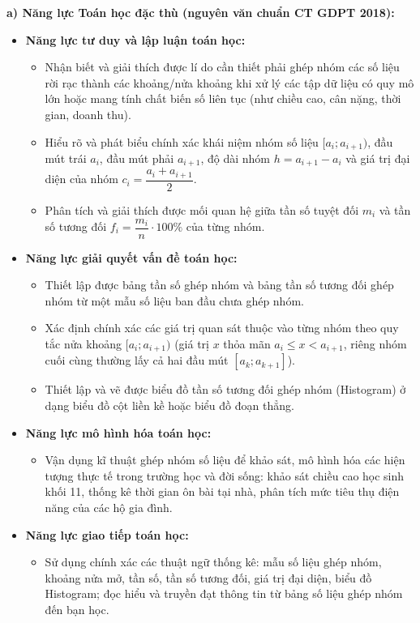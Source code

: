 \documentclass[12pt, a4paper]{article}
\begin{document}
\textbf{a) Năng lực Toán học đặc thù (nguyên văn chuẩn CT GDPT 2018):}
\begin{itemize}[leftmargin=1.5em]
    \item \textbf{Năng lực tư duy và lập luận toán học:}
    \begin{itemize}
        \item Nhận biết và giải thích được lí do cần thiết phải ghép nhóm các số liệu rời rạc thành các khoảng/nửa khoảng khi xử lý các tập dữ liệu có quy mô lớn hoặc mang tính chất biến số liên tục (như chiều cao, cân nặng, thời gian, doanh thu).
        \item Hiểu rõ và phát biểu chính xác khái niệm nhóm số liệu $[a_i; a_{i+1})$, đầu mút trái $a_i$, đầu mút phải $a_{i+1}$, độ dài nhóm $h = a_{i+1} - a_i$ và giá trị đại diện của nhóm $c_i = \dfrac{a_i + a_{i+1}}{2}$.
        \item Phân tích và giải thích được mối quan hệ giữa tần số tuyệt đối $m_i$ và tần số tương đối $f_i = \dfrac{m_i}{n} \cdot 100\%$ của từng nhóm.
    \end{itemize}
    \item \textbf{Năng lực giải quyết vấn đề toán học:}
    \begin{itemize}
        \item Thiết lập được bảng tần số ghép nhóm và bảng tần số tương đối ghép nhóm từ một mẫu số liệu ban đầu chưa ghép nhóm.
        \item Xác định chính xác các giá trị quan sát thuộc vào từng nhóm theo quy tắc nửa khoảng $[a_i; a_{i+1})$ (giá trị $x$ thỏa mãn $a_i \le x < a_{i+1}$, riêng nhóm cuối cùng thường lấy cả hai đầu mút $[a_k; a_{k+1}]$).
        \item Thiết lập và vẽ được biểu đồ tần số tương đối ghép nhóm (Histogram) ở dạng biểu đồ cột liền kề hoặc biểu đồ đoạn thẳng.
    \end{itemize}
    \item \textbf{Năng lực mô hình hóa toán học:}
    \begin{itemize}
        \item Vận dụng kĩ thuật ghép nhóm số liệu để khảo sát, mô hình hóa các hiện tượng thực tế trong trường học và đời sống: khảo sát chiều cao học sinh khối 11, thống kê thời gian ôn bài tại nhà, phân tích mức tiêu thụ điện năng của các hộ gia đình.
    \end{itemize}
    \item \textbf{Năng lực giao tiếp toán học:}
    \begin{itemize}
        \item Sử dụng chính xác các thuật ngữ thống kê: mẫu số liệu ghép nhóm, khoảng nửa mở, tần số, tần số tương đối, giá trị đại diện, biểu đồ Histogram; đọc hiểu và truyền đạt thông tin từ bảng số liệu ghép nhóm đến bạn học.

\end{itemize}
\end{itemize}
\end{document}

